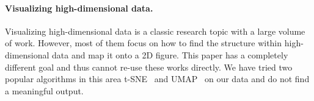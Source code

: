 
\vspace{-.1in}
\paragraph{Visualizing high-dimensional data.}
Visualizing high-dimensional data is a classic research topic with a large volume of work.
However, most of them focus on how to find the structure within high-dimensional data
and map it onto a 2D figure. This paper has a completely different goal and thus cannot
re-use these works directly. We have tried two popular algorithms in this area t-SNE~\cite{tSNE} and UMAP~\cite{UMAP} on our data 
and do not find a meaningful output. 
